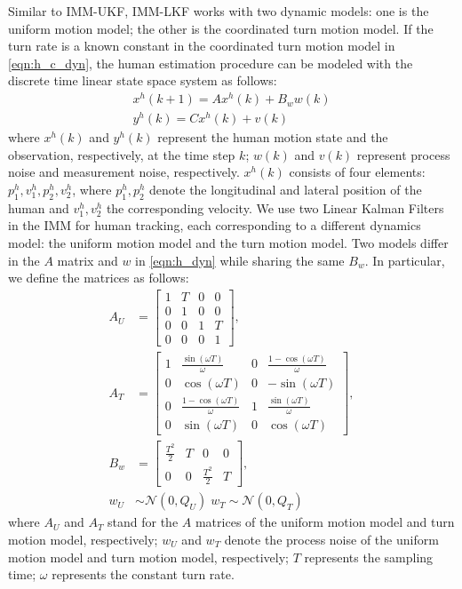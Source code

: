 \documentclass[letterpaper, 10 pt, conference]{ieeeconf}
\begin{document}
	Similar to IMM-UKF, IMM-LKF works with two dynamic models: one is the uniform motion model; the other is the coordinated turn motion model. If the turn rate is a known constant in the coordinated turn motion model in \cref{eqn:h_c_dyn}, the human estimation procedure can be modeled with the discrete time linear state space system as follows:
	\begin{subequations}
		\begin{align}
		x^h(k+1) = Ax^h(k)+B_ww(k)\label{eqn:h_dyn}\\
		y^h(k)=Cx^h(k)+v(k)\label{eqn:observation}
		\end{align}
	\end{subequations}
	where $x^h(k)$ and $y^h(k)$ represent the human motion state and the observation, respectively, at the time step $k$; $w(k)$ and $v(k)$ represent process noise and measurement noise, respectively.
	$x^h(k)$ consists of four elements: $p^h_1,v^h_1,p^h_2,v^h_2$, where $p^h_1,p^h_2$ denote the longitudinal and lateral position of the human and $v^h_1,v^h_2$ the corresponding velocity.
	We use two Linear Kalman Filters in the IMM for human tracking, each corresponding to a different dynamics model: the uniform motion model and the turn motion model.
	Two models differ in the $A$ matrix and $w$ in \cref{eqn:h_dyn} while sharing the same $B_w$.
	In particular, we define the matrices as follows:
	\begin{subequations}
		\begin{align}
		A_U&=\left[
		\begin{array}{cccc}
		1& T& 0& 0\\
		0& 1& 0& 0\\
		0& 0& 1& T\\
		0& 0& 0& 1
		\end{array}\right],\label{eqn:A_U}\\
		A_T&=\left[
		\begin{array}{cccc}
		1& \frac{\sin(\omega T)}{\omega}& 0& \frac{1-\cos(\omega T)}{\omega}\\
		0& \cos(\omega T)& 0& -\sin(\omega T)\\
		0& \frac{1-\cos(\omega T)}{\omega}& 1& \frac{\sin(\omega T)}{\omega}\\
		0& \sin(\omega T)& 0& \cos(\omega T)
		\end{array}\right],\label{eqn:A_T}\\
		B_w&=\left[
		\begin{array}{cccc}
		\frac{T^2}{2}& T& 0& 0\\
		0& 0& \frac{T^2}{2}& T
		\end{array}\right],\label{eqn:B_w}\\
		w_U&\sim\mathcal{N}(0,Q_U)\; w_T\sim\mathcal{N}(0,Q_T)\label{eqn:pro_noise}
		\end{align}
	\end{subequations}
	where $A_U$ and $A_T$ stand for the $A$ matrices of the uniform motion model and turn motion model, respectively; $w_U$ and $w_T$ denote the process noise of the uniform motion model and turn motion model, respectively; $T$ represents the sampling time; $\omega$ represents the constant turn rate.
	
\end{document}
